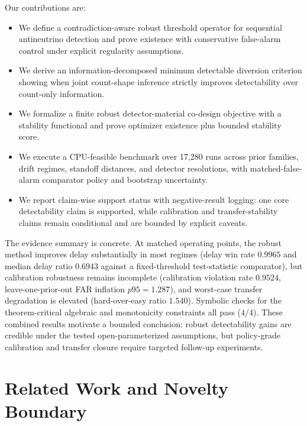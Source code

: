 Our contributions are:
\begin{itemize}
\item We define a contradiction-aware robust threshold operator for sequential antineutrino detection and prove existence with conservative false-alarm control under explicit regularity assumptions.
\item We derive an information-decomposed minimum detectable diversion criterion showing when joint count-shape inference strictly improves detectability over count-only information.
\item We formalize a finite robust detector-material co-design objective with a stability functional and prove optimizer existence plus bounded stability score.
\item We execute a CPU-feasible benchmark over 17,280 runs across prior families, drift regimes, standoff distances, and detector resolutions, with matched-false-alarm comparator policy and bootstrap uncertainty.
\item We report claim-wise support status with negative-result logging: one core detectability claim is supported, while calibration and transfer-stability claims remain conditional and are bounded by explicit caveats.
\end{itemize}

The evidence summary is concrete. At matched operating points, the robust method improves delay substantially in most regimes (delay win rate $0.9965$ and median delay ratio $0.6943$ against a fixed-threshold test-statistic comparator), but calibration robustness remains incomplete (calibration violation rate $0.9524$, leave-one-prior-out FAR inflation $p95=1.287$), and worst-case transfer degradation is elevated (hard-over-easy ratio $1.540$). Symbolic checks for the theorem-critical algebraic and monotonicity constraints all pass ($4/4$). These combined results motivate a bounded conclusion: robust detectability gains are credible under the tested open-parameterized assumptions, but policy-grade calibration and transfer closure require targeted follow-up experiments.

\section{Related Work and Novelty Boundary}\label{sec:related_work}
